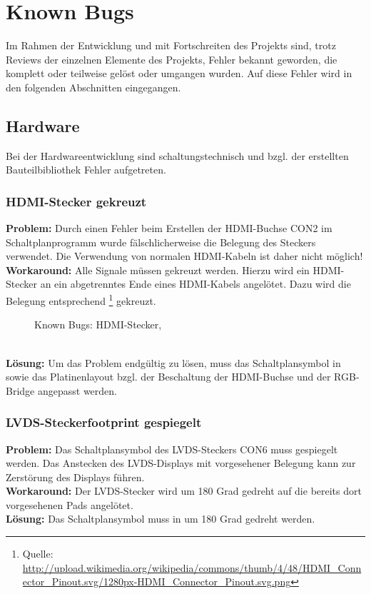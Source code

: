 \section{Known Bugs}
Im Rahmen der Entwicklung und mit Fortschreiten des Projekts sind, trotz Reviews der einzelnen Elemente des Projekts, Fehler bekannt geworden, die komplett oder teilweise gelöst oder umgangen wurden. Auf diese Fehler wird in den folgenden Abschnitten eingegangen.
\subsection{Hardware}
Bei der Hardwareentwicklung sind schaltungstechnisch und bzgl. der erstellten Bauteilbibliothek Fehler aufgetreten. 
\subsubsection{HDMI-Stecker gekreuzt}
\textbf{Problem:} Durch einen Fehler beim Erstellen der HDMI-Buchse CON2 im Schaltplanprogramm  wurde fälschlicherweise die Belegung des Steckers verwendet. Die Verwendung von normalen HDMI-Kabeln ist daher nicht möglich!\\
\textbf{Workaround:} Alle Signale müssen gekreuzt werden. Hierzu wird ein HDMI-Stecker an ein abgetrenntes Ende eines HDMI-Kabels angelötet. Dazu wird die Belegung entsprechend \footnote{Quelle: \url{http://upload.wikimedia.org/wikipedia/commons/thumb/4/48/HDMI_Connector_Pinout.svg/1280px-HDMI_Connector_Pinout.svg.png}} gekreuzt.
\begin{figure}[htp]
	\center
    \caption{Known Bugs: HDMI-Stecker, }
    \label{fig:hdmi_stecker_problem}
\end{figure}\\
\textbf{Lösung:} Um das Problem endgültig zu lösen, muss das Schaltplansymbol in  sowie das Platinenlayout bzgl. der Beschaltung der HDMI-Buchse und der RGB-Bridge angepasst werden.
\subsubsection{LVDS-Steckerfootprint gespiegelt}
\textbf{Problem:} Das Schaltplansymbol des LVDS-Steckers CON6 muss gespiegelt werden. Das Anstecken des LVDS-Displays mit vorgesehener Belegung kann zur Zerstörung des Displays führen.\\
\textbf{Workaround:} Der LVDS-Stecker wird um 180 Grad gedreht auf die bereits dort vorgesehenen Pads angelötet.\\
\textbf{Lösung:} Das Schaltplansymbol muss in  um 180 Grad gedreht werden.
